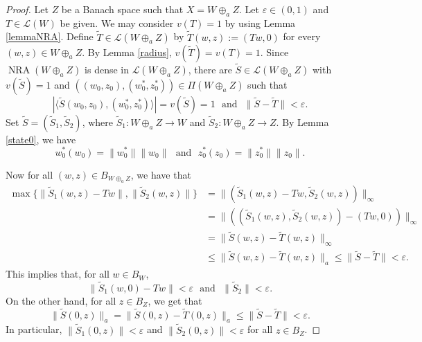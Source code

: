 \documentclass[10pt,a4paper]{amsart}
\theoremstyle{plain}
\theoremstyle{definition}
\newcommand{\eps}{\varepsilon}
\DeclareMathOperator{\NRA}{NRA}
\renewcommand{\leq}{\leqslant}
\begin{document}
\begin{proof} Let $Z$ be a Banach space such that $X = W \oplus_a Z$. Let $\eps \in (0, 1)$ and $T \in \mathcal{L}(W)$ be given. We may consider $v(T) = 1$ by using Lemma \ref{lemmaNRA}. Define $\widetilde{T} \in \mathcal{L}(W \oplus_a Z)$ by $\widetilde{T}(w, z) := (Tw, 0)$ for every $(w, z) \in W \oplus_a Z$. By Lemma \ref{radius}, $v(\widetilde{T}) = v(T) = 1$. Since $\NRA(W \oplus_a Z)$ is dense in $\mathcal{L}(W \oplus_a Z)$, there are $\widetilde{S} \in \mathcal{L}(W \oplus_a Z)$ with $v(\widetilde{S}) = 1$ and $((w_0, z_0), (w_0^*, z_0^*)) \in \Pi(W \oplus_a Z)$ such that
\begin{equation*}
|\langle \widetilde{S}(w_0, z_0), (w_0^*, z_0^*) \rangle| = v(\widetilde{S}) = 1 \ \ \ \mbox{and} \ \ \ \|\widetilde{S} - \widetilde{T}\| < \eps.	
\end{equation*}
Set $\widetilde{S} = (\widetilde{S}_1, \widetilde{S}_2)$, where $\widetilde{S}_1: W \oplus_a Z \longrightarrow W$ and $\widetilde{S}_2: W \oplus_a Z \longrightarrow Z$. By Lemma \ref{state0}, we have
\begin{equation} \label{state}
w_0^*(w_0) = \|w_0^*\| \|w_0\| \ \ \ \mbox{and} \ \ \ z_0^*(z_0) = \|z_0^*\|\|z_0\|.	
\end{equation}


\noindent
Now for all $(w, z) \in B_{W \oplus_a Z}$, we have that
\begin{align*}
\max \{ \| \widetilde{S}_1 (w, z) - Tw \|, \| \widetilde{S}_2 (w, z)\| \} &= \| ( \widetilde{S}_1(w, z) - Tw, \widetilde{S}_2(w, z))\|_{\infty} \\
&= \|((\widetilde{S}_1(w, z), \widetilde{S}_2(w, z)) - (Tw, 0))\|_{\infty} \\
&=\| \widetilde{S}(w, z) - \widetilde{T}(w, z)\|_{\infty} \\
&\leq\| \widetilde{S}(w, z) - \widetilde{T}(w, z)\|_a
\leq \|\widetilde{S} - \widetilde{T} \| < \eps.	
\end{align*}
This implies that, for all $w \in B_W$,
\begin{equation} \label{ineq1}
	\|\widetilde{S}_1(w, 0) - Tw\| < \eps \ \ \ \mbox{and} \ \ \ \|\widetilde{S}_2\| < \eps.
\end{equation}
On the other hand, for all $z \in B_Z$, we get that
\begin{equation} \label{ineq}
	\|\widetilde{S}(0, z)\|_a = \|\widetilde{S} (0, z) - \widetilde{T}(0, z)\|_a \leq \|\widetilde{S} - \widetilde{T}\| < \eps.
\end{equation}
In particular, $\|\widetilde{S}_1(0, z)\| < \eps$ and $\|\widetilde{S}_2(0, z)\| < \eps$ for all $z \in B_Z$.


\end{proof}
\end{document}
